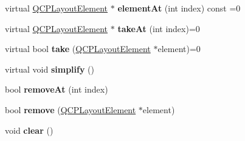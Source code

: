 \begin{DoxyCompactItemize}
\item 
virtual \hyperlink{class_q_c_p_layout_element}{Q\+C\+P\+Layout\+Element} $\ast$ {\bfseries element\+At} (int index) const =0\hypertarget{class_q_c_p_layout_ac0197e0bf3fabb51aafd8d9ba5a3a914}{}\label{class_q_c_p_layout_ac0197e0bf3fabb51aafd8d9ba5a3a914}

\item 
virtual \hyperlink{class_q_c_p_layout_element}{Q\+C\+P\+Layout\+Element} $\ast$ {\bfseries take\+At} (int index)=0\hypertarget{class_q_c_p_layout_a34a5b3bb4fa35915275cce98ebd26ba7}{}\label{class_q_c_p_layout_a34a5b3bb4fa35915275cce98ebd26ba7}

\item 
virtual bool {\bfseries take} (\hyperlink{class_q_c_p_layout_element}{Q\+C\+P\+Layout\+Element} $\ast$element)=0\hypertarget{class_q_c_p_layout_ad110be0de976cd8a817513a4a53d53db}{}\label{class_q_c_p_layout_ad110be0de976cd8a817513a4a53d53db}

\item 
virtual void {\bfseries simplify} ()\hypertarget{class_q_c_p_layout_ad218c330d746a9e58b24b5817081a478}{}\label{class_q_c_p_layout_ad218c330d746a9e58b24b5817081a478}

\item 
bool {\bfseries remove\+At} (int index)\hypertarget{class_q_c_p_layout_a2403f684fee3ce47132faaeed00bb066}{}\label{class_q_c_p_layout_a2403f684fee3ce47132faaeed00bb066}

\item 
bool {\bfseries remove} (\hyperlink{class_q_c_p_layout_element}{Q\+C\+P\+Layout\+Element} $\ast$element)\hypertarget{class_q_c_p_layout_a6c58f537d8086f352576ab7c5b15d0bc}{}\label{class_q_c_p_layout_a6c58f537d8086f352576ab7c5b15d0bc}

\item 
void {\bfseries clear} ()\hypertarget{class_q_c_p_layout_a02883bdf2769b5b227f0232dba1ac4ee}{}\label{class_q_c_p_layout_a02883bdf2769b5b227f0232dba1ac4ee}

\end{DoxyCompactItemize}
